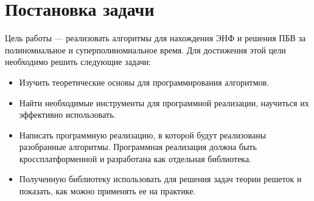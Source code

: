 \newpage

\section{Постановка задачи}

Цель работы --- реализовать алгоритмы для нахождения ЭНФ и решения ПБВ за полиномиальное и суперполиномиальное время. Для достижения этой цели необходимо решить следующие задачи:
\begin{itemize}
\item Изучить теоретические основы для программирования алгоритмов.
\item Найти необходимые инструменты для программной реализации, научиться их эффективно использовать.
\item Написать программную реализацию, в которой будут реализованы разобранные алгоритмы. Программная реализация должна быть кроссплатформенной и разработана как отдельная библиотека.
\item Полученную библиотеку использовать для решения задач теории решеток и показать, как можно применять ее на практике.
\end{itemize}  


\clearpage